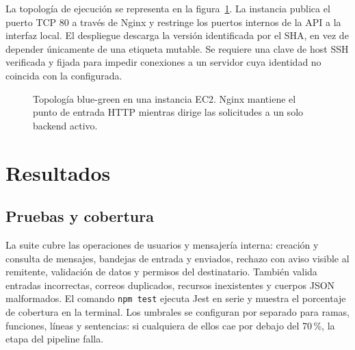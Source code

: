 \documentclass[12pt,letterpaper]{article}
\begin{document}
La topología de ejecución se representa en la figura~\ref{fig:ec2}. La instancia publica el puerto TCP 80 a través de Nginx y restringe los puertos internos de la API a la interfaz local. El despliegue descarga la versión identificada por el SHA, en vez de depender únicamente de una etiqueta mutable. Se requiere una clave de host SSH verificada y fijada para impedir conexiones a un servidor cuya identidad no coincida con la configurada.

\begin{figure}[H]
\centering
{}
\caption{Topología blue-green en una instancia EC2. Nginx mantiene el punto de entrada HTTP mientras dirige las solicitudes a un solo backend activo.}
\label{fig:ec2}
\end{figure}

\section{Resultados}
\subsection{Pruebas y cobertura}
La suite cubre las operaciones de usuarios y mensajería interna: creación y consulta de mensajes, bandejas de entrada y enviados, rechazo con aviso visible al remitente, validación de datos y permisos del destinatario. También valida entradas incorrectas, correos duplicados, recursos inexistentes y cuerpos JSON malformados. El comando \texttt{npm test} ejecuta Jest en serie y muestra el porcentaje de cobertura en la terminal. Los umbrales se configuran por separado para ramas, funciones, líneas y sentencias: si cualquiera de ellos cae por debajo del 70\,\%, la etapa del pipeline falla.
\end{document}
